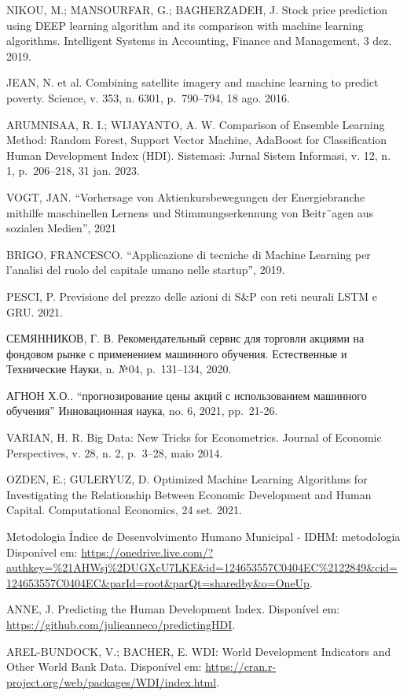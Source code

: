\documentclass[
]{article}
\begin{document}
NIKOU, M.; MANSOURFAR, G.; BAGHERZADEH, J. Stock price prediction using
DEEP learning algorithm and its comparison with machine learning
algorithms. Intelligent Systems in Accounting, Finance and Management, 3
dez. 2019.

JEAN, N. et al. Combining satellite imagery and machine learning to
predict poverty. Science, v. 353, n. 6301, p.~790--794, 18 ago. 2016.

ARUMNISAA, R. I.; WIJAYANTO, A. W. Comparison of Ensemble Learning
Method: Random Forest, Support Vector Machine, AdaBoost for
Classification Human Development Index (HDI). Sistemasi: Jurnal Sistem
Informasi, v. 12, n. 1, p.~206--218, 31 jan. 2023.

VOGT, JAN. ``Vorhersage von Aktienkursbewegungen der Energiebranche
mithilfe maschinellen Lernens und Stimmungserkennung von Beitr¨agen aus
sozialen Medien'', 2021

BRIGO, FRANCESCO. ``Applicazione di tecniche di Machine Learning per
l'analisi del ruolo del capitale umano nelle startup'', 2019.

PESCI, P. Previsione del prezzo delle azioni di S\&P con reti neurali
LSTM e GRU. 2021.

СЕМЯННИКОВ, Г. В. Рекомендательный сервис для торговли акциями на
фондовом рынке с применением машинного обучения. Естественные и
Технические Науки, n. №04, p.~131--134, 2020.

АГНОН Х.О.. ``прогнозирование цены акций с использованием машинного
обучения'' Инновационная наука, no. 6, 2021, pp.~21-26.

VARIAN, H. R. Big Data: New Tricks for Econometrics. Journal of Economic
Perspectives, v. 28, n. 2, p.~3--28, maio 2014.

OZDEN, E.; GULERYUZ, D. Optimized Machine Learning Algorithms for
Investigating the Relationship Between Economic Development and Human
Capital. Computational Economics, 24 set. 2021.

Metodologia Índice de Desenvolvimento Humano Municipal - IDHM:
metodologia Disponível em:
\url{https://onedrive.live.com/?authkey=\%21AHWsj\%2DUGXcU7LKE\&id=124653557C0404EC\%2122849\&cid=124653557C0404EC\&parId=root\&parQt=sharedby\&o=OneUp}.

ANNE, J. Predicting the Human Development Index. Disponível em:
\url{https://github.com/julieanneco/predictingHDI}.

AREL-BUNDOCK, V.; BACHER, E. WDI: World Development Indicators and Other
World Bank Data. Disponível em:
\url{https://cran.r-project.org/web/packages/WDI/index.html}.
\end{document}
